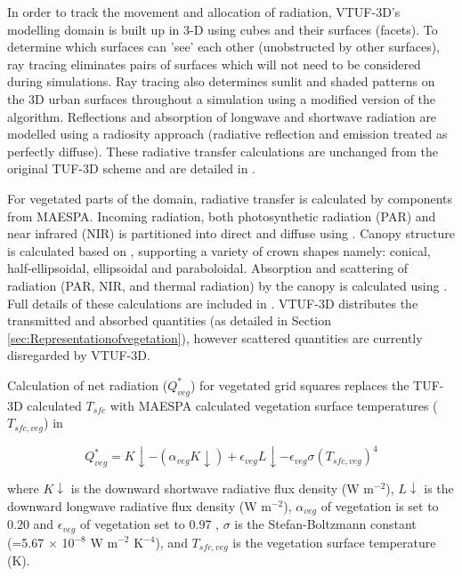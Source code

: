 \documentclass[final,3p,times,authoryear]{elsarticle}
\begin{document}
In order to track the movement and allocation of radiation, VTUF-3D’s modelling domain is built up in 3-D using cubes and their surfaces (facets). To determine which surfaces can 'see' each other (unobstructed by other surfaces), ray tracing eliminates pairs of surfaces which will not need to be considered during simulations. Ray tracing also determines sunlit and shaded patterns on the 3D urban surfaces throughout a simulation using a modified version of the \cite{Soux2004} algorithm. Reflections and absorption of longwave and shortwave radiation are modelled using a radiosity approach (radiative reflection and emission treated as perfectly diffuse). These radiative transfer calculations are unchanged from the original TUF-3D scheme and are detailed in \cite{Krayenhoff2007}.

For vegetated parts of the domain, radiative transfer is calculated by components from MAESPA. Incoming radiation, both photosynthetic radiation (PAR) and near infrared (NIR) is partitioned into direct and diffuse using \cite{Weiss1985}. Canopy structure is calculated based on \cite{Wang1990}, supporting a variety of crown shapes namely: conical, half-ellipsoidal, ellipsoidal and paraboloidal. Absorption and scattering of radiation (PAR, NIR, and thermal radiation) by the canopy is calculated using \cite{Norman1979}. Full details of these calculations are included in \cite{Duursma2012}. VTUF-3D distributes the transmitted and absorbed quantities (as detailed in Section \ref{sec:Representationofvegetation}), however scattered quantities are currently disregarded by VTUF-3D.

Calculation of net radiation ($Q^{*}_{veg}$) for vegetated grid squares replaces the TUF-3D calculated $T_{sfc}$ with MAESPA calculated vegetation surface temperatures ($T_{sfc,veg}$) in 

\begin{equation}\label{eq:rnet}
Q^{*}_{veg} = K\downarrow - (\alpha _{veg} K\downarrow) + \epsilon _{veg} L\downarrow - \epsilon _{veg} \sigma  (T_{sfc,veg}) ^{4} 
\end{equation}

where $K\downarrow$ is the downward shortwave radiative flux density (W m$^{-2}$), $L\downarrow$ is the downward longwave radiative flux density (W m$^{-2}$), $\alpha _{veg}$ of vegetation is set to 0.20 and $\epsilon _{veg}$ of vegetation set to 0.97 \citep[p. 12]{Oke1987z}, $\sigma$ is the Stefan-Boltzmann constant (=5.67 $\times$ 10$^{-8}$ W m$^{-2}$ K$^{-4}$), and $T_{sfc,veg}$ is the vegetation surface temperature (K).
\end{document}
